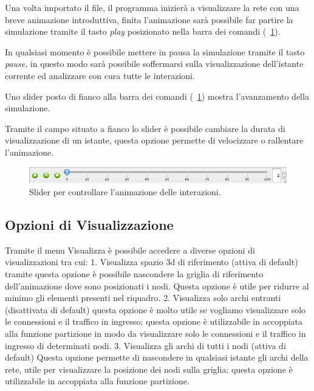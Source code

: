 \documentclass[a4paper,12pt]{article}
\begin{document}
Una volta importato il file, il programma inizier\`a a visualizzare la rete con una breve animazione introduttiva, finita l'animazione sar\`a possibile far partire la simulazione tramite il tasto \textit{play} posizionato nella barra dei comandi (\figurename~\ref{fig:slider}). 

In qualsiasi momento \`e possibile mettere in pausa la simulazione tramite il tasto \textit{pause}, in questo modo sar\`a possibile soffermarsi sulla visualizzazione dell'istante corrente ed analizzare con cura tutte le interazioni.

Uno slider posto di fianco alla barra dei comandi (\figurename~\ref{fig:slider}) mostra l'avanzamento della simulazione. 

Tramite il campo situato a fianco lo slider \`e possibile cambiare la durata di visualizzazione di un istante, questa opzione permette di velocizzare o rallentare l'animazione.
 
\begin{figure}[htb!]
 \begin{center}
  \includegraphics[width=\textwidth]{images/image1.png}
 \end{center}
 \caption{Slider per controllare l'animazione delle interazioni.}
 \label{fig:slider}
\end{figure}
 
\subsection{Opzioni di Visualizzazione}
Tramite il menu Visualizza \`e possibile accedere a diverse opzioni di visualizzazioni tra cui:
1. Visualizza spazio 3d di riferimento (attiva di default) tramite questa opzione \`e possibile nascondere la griglia di riferimento dell'animazione dove sono posizionati i nodi. Questa opzione \`e utile per ridurre al minimo gli elementi presenti nel riquadro.
2. Visualizza solo archi entranti (disattivata di default) questa opzione \`e molto utile se  vogliamo visualizzare solo le connessioni e il traffico in ingresso; questa opzione \`e utilizzabile in accoppiata alla funzione partizione in modo da visualizzare solo le connessioni e il traffico in ingresso  di determinati nodi.
3. Visualizza gli archi di tutti i nodi (attiva di default)   Questa opzione permette di nascondere in qualsiasi istante gli archi della rete, utile per visualizzare la posizione dei nodi sulla griglia; questa opzione \`e utilizzabile in accoppiata alla funzione partizione.
 
\end{document}
